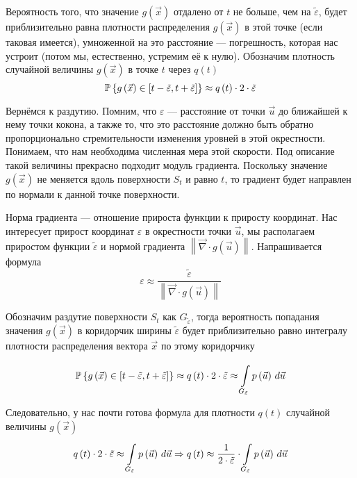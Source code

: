Вероятность того, что значение $g\left( \vec{x} \right)$
отдалено от $t$ не больше, чем на $\tilde{\varepsilon}$,
будет приблизительно равна плотности распределения $g\left( \vec{x} \right)$
в этой точке (если таковая имеется),
умноженной на это расстояние --- погрешность,
которая нас устроит (потом мы, естественно, устремим её к нулю).
Обозначим плотность случайной величины $g\left( \vec{x} \right)$
в точке $t$ через $q\left( t \right)$
$$\Probability{g\left( \vec{x} \right)
    \in \left[t-\tilde{\varepsilon}, t+\tilde{\varepsilon}\right]}
    \approx q\left( t \right) \cdot 2 \cdot \tilde{\varepsilon}$$

Вернёмся к раздутию. Помним, что $\varepsilon$ --- расстояние от
точки $\vec{u}$ до ближайшей к нему точки кокона, а также то,
что это расстояние должно быть обратно пропорционально
стремительности изменения уровней в этой окрестности.
Понимаем, что нам необходима численная мера этой скорости.
Под описание такой величины прекрасно подходит модуль градиента.
Поскольку значение $g\left( \vec{x} \right)$ не меняется вдоль поверхности $S_t$
и равно $t$, то градиент будет направлен по нормали к данной точке поверхности.

Норма градиента --- отношение прироста функции к приросту координат.
Нас интересует прирост координат $\varepsilon$ в окрестности точки $\vec{u}$,
мы располагаем приростом функции $\tilde{\varepsilon}$
и нормой градиента
$\left\| \vec{\nabla} \cdot {g\left( \vec{u} \right)} \right\|$.
Напрашивается формула
\begin{equation}\label{widthEpsilon}
    \varepsilon \approx \frac{\tilde{\varepsilon}}
        {\left\| \vec{\nabla} \cdot g\left( \vec{u} \right) \right\|}
\end{equation}

Обозначим раздутие поверхности $S_t$ как $G_{\tilde{\varepsilon}}$,
тогда вероятность попадания значения $g\left( \vec{x} \right)$ в коридорчик
ширины $\tilde{\varepsilon}$ будет приблизительно равно интегралу
плотности распределения вектора $\vec{x}$ по этому коридорчику

$$\Probability{g\left( \vec{x} \right)
    \in \left[t-\tilde{\varepsilon}, t+\tilde{\varepsilon}\right]}
    \approx q\left( t \right) \cdot 2 \cdot \tilde{\varepsilon}
    \approx \integrall{G_{\tilde{\varepsilon}}}{d\vec{u}}{\pdf{\vec{u}}}$$

Следовательно, у нас почти готова формула для плотности $q\left( t \right)$
случайной величины $g\left( \vec{x} \right)$
$$q\left( t \right) \cdot 2 \cdot \tilde{\varepsilon}
        \approx \integrall{G_{\tilde{\varepsilon}}}{d\vec{u}}{\pdf{\vec{u}}}
        \Rightarrow q\left( t \right)
            \approx \frac{1}{2 \cdot \tilde{\varepsilon}}
                \cdot \integrall{G_{\tilde{\varepsilon}}}{d\vec{u}}{
                    \pdf{\vec{u}}}$$


